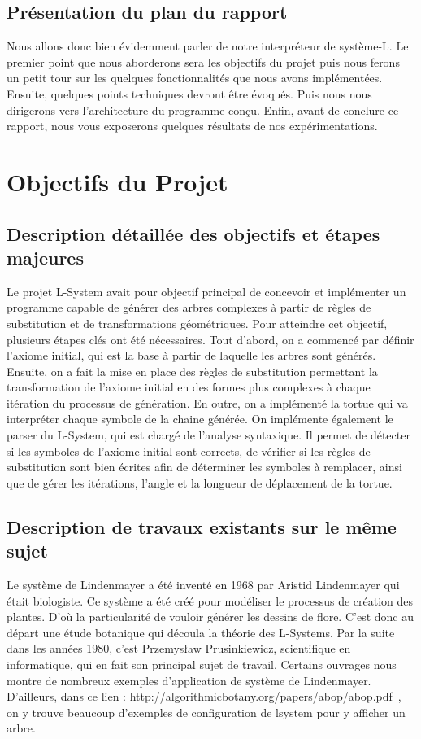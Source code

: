 \documentclass[12pt]{article}
\begin{document}
\subsection{Présentation du plan du rapport}
Nous allons donc bien évidemment parler de notre interpréteur de système-L. Le premier point que nous aborderons sera les objectifs du projet puis nous ferons un petit tour sur les quelques fonctionnalités que nous avons implémentées. Ensuite, quelques points techniques devront être évoqués. Puis nous nous dirigerons vers l'architecture du programme conçu. Enfin, avant de conclure ce rapport, nous vous exposerons quelques résultats de nos expérimentations.



\section{Objectifs du Projet}

\subsection{Description détaillée des objectifs et étapes majeures}
Le projet L-System avait pour objectif principal de concevoir et implémenter un programme capable de générer des arbres complexes à partir de règles de substitution et de transformations géométriques. Pour atteindre cet objectif, plusieurs étapes clés ont été nécessaires. Tout d'abord, on a commencé par définir l'axiome initial, qui est la base à partir de laquelle les arbres sont générés. Ensuite, on a fait la mise en place des règles de substitution permettant la transformation de l'axiome initial en des formes plus complexes à chaque itération du processus de génération. En outre, on a implémenté la tortue qui va interpréter chaque symbole de la chaine générée.
On implémente également le parser du L-System, qui est chargé de l'analyse syntaxique. Il permet de détecter si les symboles de l'axiome initial sont corrects, de vérifier si les règles de substitution sont bien écrites afin de déterminer les symboles à remplacer, ainsi que de gérer les itérations, l'angle et la longueur de déplacement de la tortue. 

\subsection{Description de travaux existants sur le même sujet}
Le système de Lindenmayer a été inventé en 1968 par Aristid Lindenmayer qui était biologiste. Ce système a été créé pour modéliser le processus de création des plantes. D'où la particularité de vouloir générer les dessins de flore. C'est donc au départ une étude botanique qui découla la théorie des L-Systems. Par la suite dans les années 1980, c'est Przemysław Prusinkiewicz, scientifique en informatique, qui en fait son principal sujet de travail. Certains ouvrages nous montre de nombreux exemples d'application de système de Lindenmayer. D'ailleurs, dans ce lien : \url{http://algorithmicbotany.org/papers/abop/abop.pdf}~\label{lien:lien1}, on y trouve beaucoup d'exemples de configuration de lsystem pour y afficher un arbre.
\end{document}

